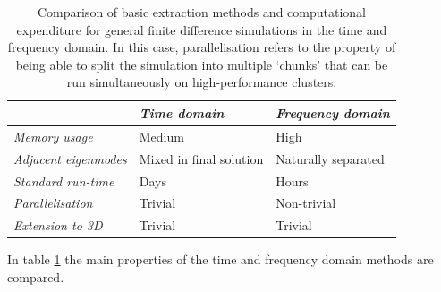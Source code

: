 \begin{table}[]
\centering
\begin{tabular}{|l|l|l|}
\hline
                             & \textit{Time domain}    & \textit{Frequency domain}         \\ \hline
\textit{Memory usage}        & Medium                  & High                              \\ \hline
\textit{Adjacent eigenmodes} & Mixed in final solution & Naturally separated               \\ \hline
\textit{Standard run-time}   & Days                    & Hours                             \\ \hline
\textit{Parallelisation}   & Trivial                 & Non-trivial \\ \hline
\textit{Extension to 3D}   & Trivial                 & Trivial \\ \hline
\end{tabular}
\caption[Comparison of \textit{FDTD} and \textit{FDFD} methods]{Comparison of basic extraction methods and computational expenditure for general finite difference simulations in the time and frequency domain. In this case, parallelisation refers to the property of being able to split the simulation into multiple `chunks' that can be run simultaneously on high-performance clusters.}
\label{comparisonFD}
\end{table}

In table \ref{comparisonFD} the main properties of the time and frequency domain methods are compared.


